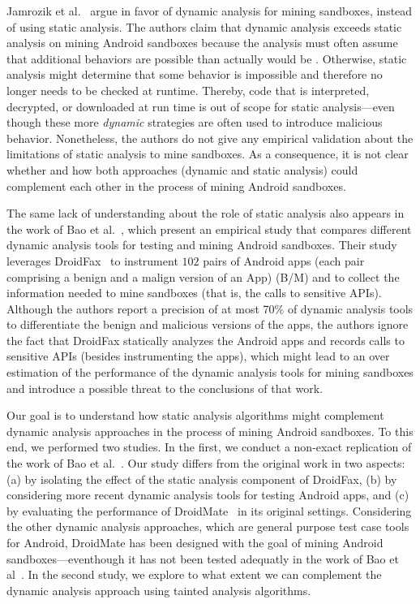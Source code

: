 Jamrozik et al.~\cite{DBLP:conf/icse/JamrozikSZ16} argue in favor of dynamic analysis for mining sandboxes, instead of using static analysis. The authors claim that dynamic analysis exceeds static analysis on mining Android sandboxes because the analysis must often assume that additional behaviors are possible than actually would be . Otherwise, static analysis might determine that some behavior is impossible and therefore no longer needs to be checked at runtime. Thereby, code that is interpreted, decrypted, or downloaded at run time is out of scope for static analysis---even though these more \emph{dynamic} strategies are often used to introduce malicious behavior. Nonetheless, the authors do not give any empirical validation about the limitations of static analysis to mine sandboxes. As a consequence, it is not clear whether and how both approaches (dynamic and static analysis) could complement each other in the process of mining Android sandboxes.

The same lack of understanding about the role of static analysis also appears in the work of Bao et al.~\cite{DBLP:conf/wcre/BaoLL18}, which present an empirical study that compares different dynamic analysis tools for testing and mining Android sandboxes. Their study leverages DroidFax~\cite{DBLP:conf/icsm/CaiR17a} to instrument $102$ pairs of Android apps (each pair comprising a benign and a malign version of an App) (B/M) and to collect the information needed to mine sandboxes (that is, the calls to sensitive APIs).
Although the authors report a precision of at most 70\% of dynamic analysis tools to differentiate the benign and malicious versions of the apps, the authors ignore the fact that DroidFax statically analyzes the Android apps and records calls to sensitive APIs (besides instrumenting the apps), which might lead to an over estimation of the performance of the dynamic analysis tools for mining sandboxes and introduce a possible threat to the conclusions of that work.

Our goal is to understand how static analysis
algorithms might complement dynamic analysis approaches in the process of mining Android sandboxes. To this end, we performed two studies. In the
first, we conduct a non-exact replication of the work of Bao et al.~\cite{DBLP:conf/wcre/BaoLL18}. Our study differs from the original work in two aspects: (a)
by isolating the effect of the static analysis component of DroidFax, (b) by considering more recent dynamic analysis tools for testing Android apps,
and (c) by evaluating the performance of DroidMate~\cite{DBLP:conf/icse/JamrozikZ16} in its original settings. Considering the other dynamic analysis approaches, which are
general purpose test case tools for Android, DroidMate has been designed with the goal of mining Android sandboxes---eventhough it has not been tested adequatly
in the work of Bao et al~\cite{DBLP:conf/wcre/BaoLL18}. In the second study, we explore to what extent we can complement the dynamic analysis approach using
tainted analysis algorithms.


